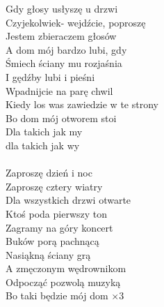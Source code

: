 \documentclass[a5paper, 10pt]{book}
\begin{document}
\begin{minipage}[t]{0.65\textwidth}
  Gdy głosy usłyszę u drzwi\\
  Czyjekolwiek- wejdźcie, poproszę\\
  Jestem zbieraczem głosów\\
  A dom mój bardzo lubi, gdy\\
  Śmiech ściany mu rozjaśnia\\
  I gędźby lubi i pieśni\\
  Wpadnijcie na parę chwil\\
  Kiedy los was zawiedzie w te strony\\
  Bo dom mój otworem stoi\\
  Dla takich jak my\\ dla takich jak wy\\
  \\
  Zaproszę dzień i noc\\
  Zaproszę cztery wiatry\\
  Dla wszystkich drzwi otwarte\\
  Ktoś poda pierwszy ton\\
  Zagramy na góry koncert\\
  Buków porą pachnącą\\
  Nasiąkną ściany grą\\
  A zmęczonym wędrownikom\\
  Odpocząć pozwolą muzyką\\
  Bo taki będzie mój dom $\times 3$\\

\end{minipage}
\end{document}
